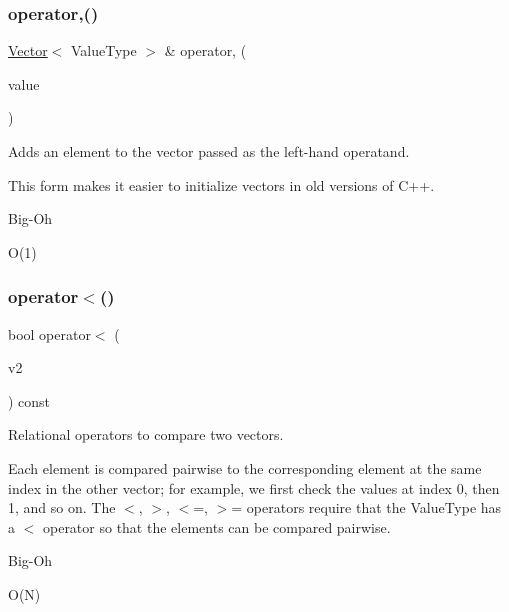 \subsubsection{\texorpdfstring{operator,()}{operator,()}}
{\footnotesize\ttfamily \mbox{\hyperlink{classVector}{Vector}}$<$ Value\+Type $>$ \& operator, (\begin{DoxyParamCaption}\item[{const Value\+Type \&}]{value }\end{DoxyParamCaption})}



Adds an element to the vector passed as the left-\/hand operatand. 

This form makes it easier to initialize vectors in old versions of C++. \begin{DoxyRefDesc}{Big-\/\+Oh}
\item[\mbox{\hyperlink{BigOh__BigOh000152}{Big-\/\+Oh}}]O(1) \end{DoxyRefDesc}
\mbox{\label{classVector_a77901fd042b59d646be1da79b8339c5c}} 
\subsubsection{\texorpdfstring{operator$<$()}{operator<()}}
{\footnotesize\ttfamily bool operator$<$ (\begin{DoxyParamCaption}\item[{const \mbox{\hyperlink{classVector}{Vector}}$<$ Value\+Type $>$ \&}]{v2 }\end{DoxyParamCaption}) const}



Relational operators to compare two vectors. 

Each element is compared pairwise to the corresponding element at the same index in the other vector; for example, we first check the values at index 0, then 1, and so on. The $<$, $>$, $<$=, $>$= operators require that the Value\+Type has a $<$ operator so that the elements can be compared pairwise. \begin{DoxyRefDesc}{Big-\/\+Oh}
\item[\mbox{\hyperlink{BigOh__BigOh000146}{Big-\/\+Oh}}]O(\+N) \end{DoxyRefDesc}
\mbox{\label{classVector_ae70337b6c4c49dde850031de8b68c05d}} 
